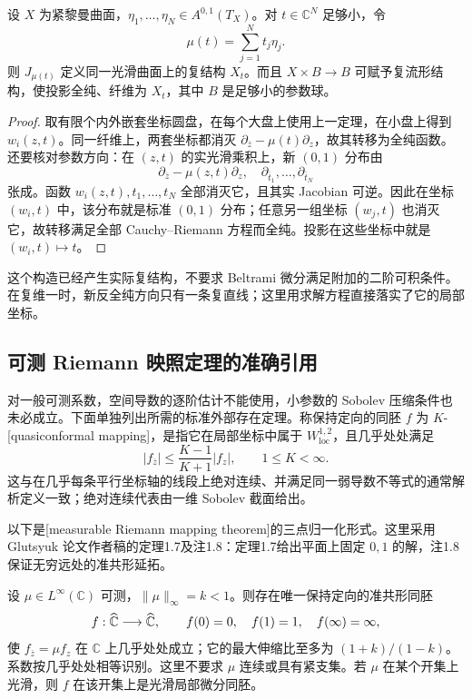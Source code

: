 \begin{corollary}\label{g4:cor:0602:holomorphic-family}
	设 \(X\) 为紧黎曼曲面，\(\eta_1,\ldots,\eta_N\in A^{0,1}(T_X)\)。对 \(t\in\mathbb C^N\) 足够小，令
	\[
		\mu(t)=\sum_{j=1}^N t_j\eta_j.
	\]
	则 \(J_{\mu(t)}\) 定义同一光滑曲面上的复结构 \(X_t\)。而且 \(X\times B\to B\) 可赋予复流形结构，使投影全纯、纤维为 \(X_t\)，其中 \(B\) 是足够小的参数球。
\end{corollary}
\begin{proof}
	取有限个内外嵌套坐标圆盘，在每个大盘上使用上一定理，在小盘上得到 \(w_i(z,t)\)。同一纤维上，两套坐标都消灭 \(\partial_{\overline z}-\mu(t)\partial_z\)，故其转移为全纯函数。还要核对参数方向：在 \((z,t)\) 的实光滑乘积上，新 \((0,1)\) 分布由
	\[
		\partial_{\overline z}-\mu(z,t)\partial_z,
		\quad \partial_{\overline t_1},\ldots,\partial_{\overline t_N}
	\]
	张成。函数 \(w_i(z,t),t_1,\ldots,t_N\) 全部消灭它，且其实 Jacobian 可逆。因此在坐标 \((w_i,t)\) 中，该分布就是标准 \((0,1)\) 分布；任意另一组坐标 \((w_j,t)\) 也消灭它，故转移满足全部 Cauchy--Riemann 方程而全纯。投影在这些坐标中就是 \((w_i,t)\mapsto t\)。
\end{proof}

这个构造已经产生实际复结构，不要求 Beltrami 微分满足附加的二阶可积条件。在复维一时，新反全纯方向只有一条复直线；这里用求解方程直接落实了它的局部坐标。

\subsection{可测 Riemann 映照定理的准确引用}
\label{g4:subsec:0602:03}

对一般可测系数，空间导数的逐阶估计不能使用，小参数的 Sobolev 压缩条件也未必成立。下面单独列出所需的标准外部存在定理。称保持定向的同胚 \(f\) 为 \(K\)-[quasiconformal mapping]，是指它在局部坐标中属于 \(W^{1,2}_{\mathrm{loc}}\)，且几乎处处满足
\[
	|f_{\overline z}|\le\frac{K-1}{K+1}|f_z|,
	\qquad 1\le K<\infty.
\]
这与在几乎每条平行坐标轴的线段上绝对连续、并满足同一弱导数不等式的通常解析定义一致；绝对连续代表由一维 Sobolev 截面给出。

以下是[measurable Riemann mapping theorem]的三点归一化形式。这里采用 Glutsyuk 论文作者稿的定理1.7及注1.8：定理1.7给出平面上固定 \(0,1\) 的解，注1.8保证无穷远处的准共形延拓。\cite[作者稿 arXiv:math/0510071，定理1.7、注1.8，第3页；证明见第3.1--3.4节]{Glutsyuk2008Uniformization}
\begin{theorem}\label{g4:thm:0602:measurable-riemann}
	设 \(\mu\in L^\infty(\mathbb C)\) 可测，\(\|\mu\|_\infty=k<1\)。则存在唯一保持定向的准共形同胚
	\[
		f:\widehat{\mathbb C\mkern0mu}\longrightarrow\widehat{\mathbb C\mkern0mu},
		\qquad f(0)=0,\quad f(1)=1,\quad f(\infty)=\infty,
	\]
	使 \(f_{\overline z}=\mu f_z\) 在 \(\mathbb C\) 上几乎处处成立；它的最大伸缩比至多为 \((1+k)/(1-k)\)。系数按几乎处处相等识别。这里不要求 \(\mu\) 连续或具有紧支集。若 \(\mu\) 在某个开集上光滑，则 \(f\) 在该开集上是光滑局部微分同胚。
\end{theorem}

